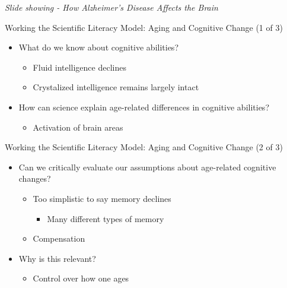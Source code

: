 \documentclass[
]{book}
\providecommand{\tightlist}{%
  \setlength{\itemsep}{0pt}\setlength{\parskip}{0pt}}
\begin{document}
\begin{reflect}
\emph{Slide showing - How Alzheimer's Disease Affects the Brain}

Working the Scientific Literacy Model: Aging and Cognitive Change (1 of 3)

\begin{itemize}
\tightlist
\item
  What do we know about cognitive abilities?

  \begin{itemize}
  \tightlist
  \item
    Fluid intelligence declines
  \item
    Crystalized intelligence remains largely intact
  \end{itemize}
\item
  How can science explain age-related differences in cognitive abilities?

  \begin{itemize}
  \tightlist
  \item
    Activation of brain areas
  \end{itemize}
\end{itemize}

Working the Scientific Literacy Model: Aging and Cognitive Change (2 of 3)

\begin{itemize}
\tightlist
\item
  Can we critically evaluate our assumptions about age-related cognitive changes?

  \begin{itemize}
  \tightlist
  \item
    Too simplistic to say memory declines

    \begin{itemize}
    \tightlist
    \item
      Many different types of memory
    \end{itemize}
  \item
    Compensation
  \end{itemize}
\item
  Why is this relevant?

  \begin{itemize}
  \tightlist
  \item
    Control over how one ages
  \end{itemize}
\end{itemize}


\end{reflect}
\end{document}
